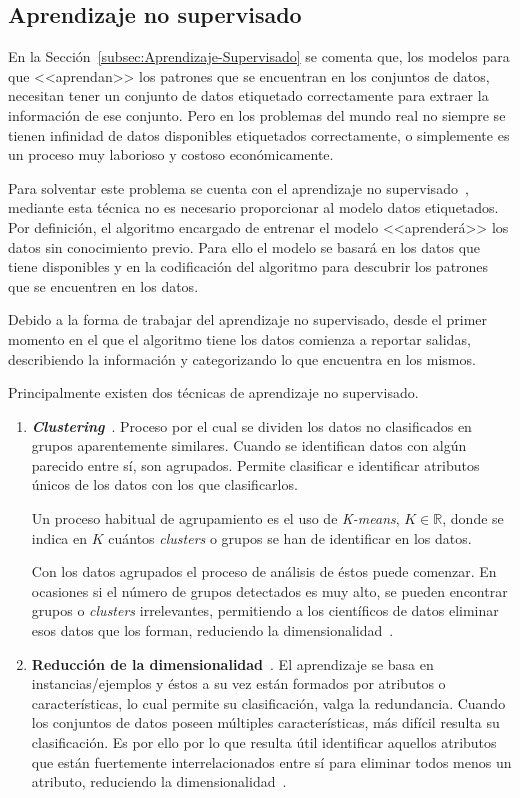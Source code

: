 \subsection{Aprendizaje no supervisado}\label{subsec:Aprendizaje-No-Supervisado}
En la Sección~\ref{subsec:Aprendizaje-Supervisado} se comenta que, los modelos para que <<aprendan>> los patrones que se encuentran en los conjuntos de datos, necesitan tener un conjunto de datos etiquetado correctamente para extraer la información de ese conjunto. Pero en los problemas del mundo real no siempre se tienen infinidad de datos disponibles etiquetados correctamente, o simplemente es un proceso muy laborioso y costoso económicamente.

Para solventar este problema se cuenta con el aprendizaje no supervisado~\cite{bengio2012unsupervised}, mediante esta técnica no es necesario proporcionar al modelo datos etiquetados. Por definición, el algoritmo encargado de entrenar el modelo  <<aprenderá>> los datos sin conocimiento previo. Para ello el modelo se basará en los datos que tiene disponibles y en la codificación del algoritmo para descubrir los patrones que se encuentren en los datos.

Debido a la forma de trabajar del aprendizaje no supervisado, desde el primer momento en el que el algoritmo tiene los datos comienza a reportar salidas, describiendo la información y categorizando lo que encuentra en los mismos.

Principalmente existen dos técnicas de aprendizaje no supervisado.
\begin{enumerate}
	\item \textbf{\textit{Clustering}}~\cite{unsupervised_learning_clustering}. Proceso por el cual se dividen los datos no clasificados en grupos aparentemente similares. Cuando se identifican datos con algún parecido entre sí, son agrupados. Permite clasificar e identificar atributos únicos de los datos con los que clasificarlos. 
	
	Un proceso habitual de agrupamiento es el uso de \textit{K-means}, $K\in\mathbb{R}$, donde se indica en $K$ cuántos \textit{clusters} o grupos se han de identificar en los datos.
	
	Con los datos agrupados el proceso de análisis de éstos puede comenzar. En ocasiones si el número de grupos detectados es muy alto, se pueden encontrar grupos o \textit{clusters} irrelevantes, permitiendo a los científicos de datos eliminar esos datos que los forman, reduciendo la dimensionalidad~\cite{boutsidis2014randomized}.
	
	\item \textbf{Reducción de la dimensionalidad}~\cite{li2002unsupervised}. El aprendizaje se basa en instancias/ejemplos y éstos a su vez están formados por atributos o características, lo cual permite su clasificación, valga la redundancia. Cuando los conjuntos de datos poseen múltiples características, más difícil resulta su clasificación. Es por ello por lo que resulta útil identificar aquellos atributos que están fuertemente interrelacionados entre sí para eliminar todos menos un atributo, reduciendo la dimensionalidad~\cite{li2002unsupervised}.
\end{enumerate}

